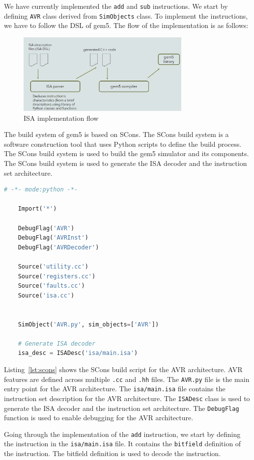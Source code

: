 We have currently implemented the \texttt{add} and \texttt{sub} instructions. We start by defining \texttt{AVR} class derived from \texttt{SimObjects} class. To implement the instructions, we have to follow the DSL of gem5. The flow of the implementation is as follows:
\begin{figure}[h]
	\centering
	\includegraphics[width=8.5cm]{figs/flow.png}
	\caption{ISA implementation flow}
	\label{fig:implementation_flow}
\end{figure}

The build system of gem5 is based on SCons. The SCons build system is a software construction tool that uses Python scripts to define the build process. The SCons build system is used to build the gem5 simulator and its components. The SCons build system is used to generate the ISA decoder and the instruction set architecture.
\begin{lstlisting}[language=python, caption={Build script in SCons}, label={lst:scons}]
    # -*- mode:python -*-

    Import('*')
    
    DebugFlag('AVR')
    DebugFlag('AVRInst')
    DebugFlag('AVRDecoder')
    
    Source('utility.cc')
    Source('registers.cc')
    Source('faults.cc')
    Source('isa.cc')
    
    
    SimObject('AVR.py', sim_objects=['AVR'])
    
    # Generate ISA decoder
    isa_desc = ISADesc('isa/main.isa')    
\end{lstlisting}
Listing~\ref{lst:scons} shows the SCons build script for the AVR architecture. AVR features are defined across multiple \texttt{.cc} and \texttt{.hh} files. The \texttt{AVR.py} file is the main entry point for the AVR architecture. The \texttt{isa/main.isa} file contains the instruction set description for the AVR architecture. The \texttt{ISADesc} class is used to generate the ISA decoder and the instruction set architecture. The \texttt{DebugFlag} function is used to enable debugging for the AVR architecture.

Going through the implementation of the \texttt{add} instruction, we start by defining the instruction in the \texttt{isa/main.isa} file. It contains the \texttt{bitfield} definition of the instruction. The bitfield definition is used to decode the instruction.

